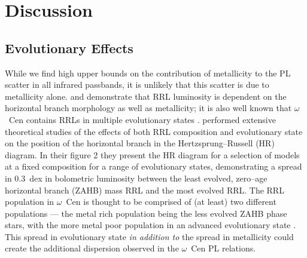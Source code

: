 \documentclass[a4paper,fleqn,usenatbib]{mnras}
\newcommand{\ocen}{$\omega$~Cen\xspace}
\begin{document}
\section{Discussion}
\label{sec:discussion}




\subsection{Evolutionary Effects}
\label{sec:evolution}
While we find high upper bounds on the contribution of metallicity to the PL scatter in all infrared passbands, it is unlikely that this scatter is due to metallicity alone. \citet{1986A&A...169..111G} and \citet{1991ApJ...373L..43L}  demonstrate that RRL luminosity is dependent on the horizontal branch morphology as well as metallicity; it is also well known that \ocen contains RRLs in multiple evolutionary states \citep{2008MmSAI..79..342S, 2015A&A...577A..99N}. \citet{2015ApJ...808...50M} performed extensive theoretical studies of the effects of both RRL composition and evolutionary state on the position of the horizontal branch in the Hertzsprung--Russell (HR) diagram. In their figure 2 they present the HR diagram for a selection of models at a fixed composition for a range of evolutionary states, demonstrating a spread in 0.3~dex in bolometric luminosity between the least evolved, zero--age horizontal branch (ZAHB) mass RRL and the most evolved RRL. The RRL population in \ocen is thought to be comprised of (at least) two different populations --- the metal rich population being the less evolved ZAHB phase stars, with the more metal poor population in an advanced evolutionary state \citep{2016MNRAS.457.4525T}. This spread in evolutionary state \textit{in addition to} the spread in metallicity could create the additional dispersion observed in the \ocen PL relations. 
\end{document}
